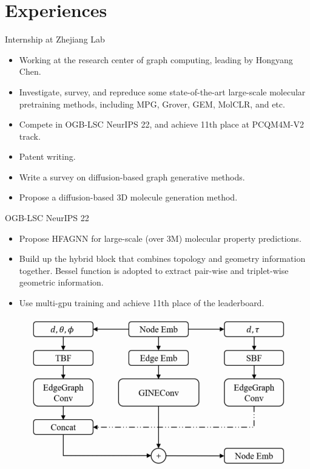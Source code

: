 \documentclass{beamer}
\begin{document}
\section{Experiences}
\begin{frame}{Internship at Zhejiang Lab}
    \begin{itemize}
        \item Working at the research center of graph computing, leading by Hongyang Chen.
        \item Investigate, survey, and repreduce some state-of-the-art large-scale molecular pretraining methods, including MPG, Grover, GEM, MolCLR, and etc.
        \item Compete in OGB-LSC NeurIPS 22, and achieve 11th place at PCQM4M-V2 track.
        \item Patent writing.
        \item Write a survey on diffusion-based graph generative methods.
        \item Propose a diffusion-based 3D molecule generation method.
    \end{itemize}
\end{frame}

\begin{frame}{OGB-LSC NeurIPS 22}
    \begin{itemize}
        \item Propose HFAGNN for large-scale (over 3M) molecular property predictions.
        \item Build up the hybrid block that combines topology and geometry information together. Bessel function is adopted to extract pair-wise and triplet-wise geometric information.
        \item Use multi-gpu training and achieve 11th place of the leaderboard. 
    \end{itemize}
    \begin{figure}[H]
        \centering
        \includegraphics[width=0.6\linewidth]{figure/hfagnn.png}
    \end{figure}
\end{frame}
\end{document}

